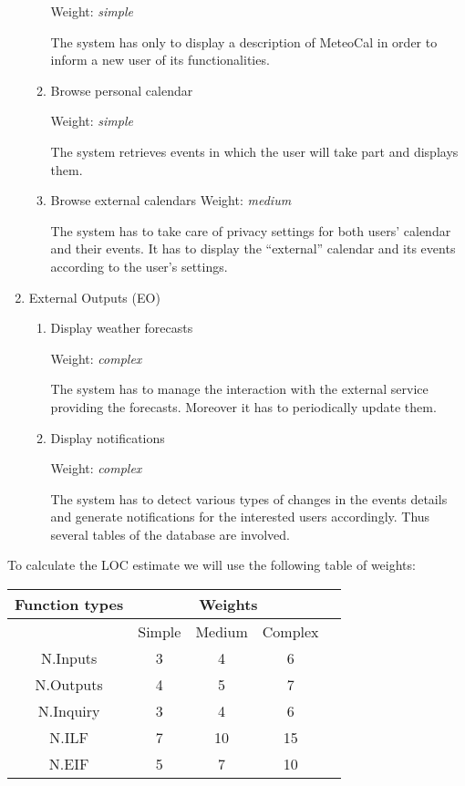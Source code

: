 \documentclass[10pt,a4paper,titlepage]{article}
\begin{document}
\begin{enumerate}
\begin{enumerate}
Weight: \textit{simple}

The system has only to display a description of MeteoCal in order to 
inform a new user of its functionalities. 
 
\item Browse personal calendar 
 
Weight: \textit{simple}

The system retrieves events in which the user will take part and 
displays them.  
 
\item Browse external calendars 
Weight: \textit{medium}
 
The system has to take care of privacy settings for both users' calendar 
and their events. It has to display the ``external'' calendar and its events 
according to the user's settings. 
\end{enumerate}

\item External Outputs (EO)
\begin{enumerate}
\item Display weather forecasts 
 
Weight: \textit{complex}

The system has to manage the interaction with the external service 
providing the forecasts. Moreover it has to periodically update them. 
 
\item Display notifications 

Weight: \textit{complex}

The system has to detect various types of changes in the events details 
and generate notifications for the interested users accordingly. Thus 
several tables of the database are involved. 
\end{enumerate}
\end{enumerate}

 
To calculate the LOC estimate we will use the following table of weights:

\begin{center}\begin{tabular}{|c|c|c|c|c|}
\hline
\textbf{Function types} & \multicolumn{3}{|c|}{\textbf{Weights}} \\
\hline				&	Simple	&	Medium	& Complex	\\
\hline	N.Inputs	&	3		&	4		&	6		\\
\hline	N.Outputs	&	4		&	5		&	7		\\
\hline	N.Inquiry	&	3		&	4		&	6		\\
\hline	N.ILF		&	7		&	10		&	15		\\
\hline	N.EIF		&	5		&	7		&	10		\\
\hline\end{tabular}\end{center}
\end{document}

